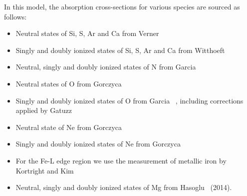 			In this model, the absorption cross-sections for various species are sourced as follows:
			\begin{itemize}
				\item Neutral states of Si, S, Ar and Ca from Verner \etal\ \cite{vernerXS}
				\item Singly and doubly ionized states of Si, S, Ar and Ca from Witthoeft \etal\ \cite{witthoeftXS1,witthoeftXS2}
				\item Neutral, singly and doubly ionized states of N from Garcia \etal\ \cite{garciaXS1}
				\item Neutral states of O from Gorczyca \etal\ \cite{gorczycaXS1}
				\item Singly and doubly ionized states of O from Garcia \etal\ \cite{garciaXS2}, including corrections applied by Gatuzz \etal\ \cite{gatuzzXS}
				\item Neutral state of Ne from Gorczyca \etal\ \cite{gorczycaXS2}
				\item Singly and doubly ionized states of Ne from Gorczyca \etal\ \cite{gorczycaXS3}
				\item For the Fe-L edge region we use the measurement of metallic iron by Kortright and Kim \cite{kortrightXS}
				\item Neutral, singly and doubly ionized states of Mg from Hasoglu \etal\ (2014).
			\end{itemize}
			
